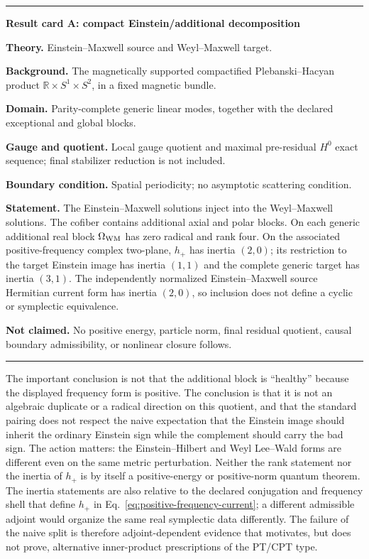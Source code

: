 \documentclass[11pt]{article}
\newcommand{\R}{\mathbb R}
\newenvironment{resultcard}[1]
 {\par\medskip\noindent\hrule\smallskip\noindent\textbf{#1}\par\smallskip}
 {\par\smallskip\hrule\medskip}
\begin{document}
\begin{resultcard}{Result card A: compact Einstein/additional decomposition}
\textbf{Theory.} Einstein--Maxwell source and Weyl--Maxwell target.\par
\textbf{Background.} The magnetically supported compactified
Plebanski--Hacyan product $\R\times S^1\times S^2$, in a fixed magnetic
bundle.\par
\textbf{Domain.} Parity-complete generic linear modes, together with the
declared exceptional and global blocks.\par
\textbf{Gauge and quotient.} Local gauge quotient and maximal pre-residual
$H^0$ exact sequence; final stabilizer reduction is not included.\par
\textbf{Boundary condition.} Spatial periodicity; no asymptotic scattering
condition.\par
\textbf{Statement.} The Einstein--Maxwell solutions inject into the
Weyl--Maxwell solutions.  The cofiber contains additional axial and polar
blocks.  On each generic additional real block $\Omega_{\rm WM}$ has zero
radical and rank four.  On the associated positive-frequency complex
two-plane, $h_+$ has inertia $(2,0)$; its restriction to the target Einstein
image has inertia $(1,1)$ and the complete generic target has inertia
$(3,1)$.  The independently normalized Einstein--Maxwell source Hermitian
current form has inertia $(2,0)$, so inclusion does not define a cyclic or
symplectic equivalence.\par
\textbf{Not claimed.} No positive energy, particle norm, final residual
quotient, causal boundary admissibility, or nonlinear closure follows.
\end{resultcard}

The important conclusion is not that the additional block is ``healthy''
because the displayed frequency form is positive.  The conclusion is that it
is not
an algebraic duplicate or a radical direction on this quotient, and that the
standard pairing does not respect the naive expectation that the Einstein
image should inherit the ordinary Einstein sign while the complement should
carry the bad sign.  The action matters: the Einstein--Hilbert and Weyl
Lee--Wald forms are different even on the same metric perturbation.  Neither
the rank statement nor the inertia of $h_+$ is by itself a positive-energy or
positive-norm quantum theorem.  The inertia statements are also relative to
the declared conjugation and frequency shell that define $h_+$ in
Eq.~\eqref{eq:positive-frequency-current}; a different admissible adjoint
would organize the same real symplectic data differently.  The failure of
the naive split is therefore adjoint-dependent evidence that motivates, but
does not prove, alternative inner-product prescriptions of the PT/CPT
type\cite{BenderMannheim}.
\end{document}
